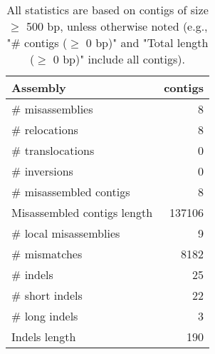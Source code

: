 \documentclass[12pt,a4paper]{article}
\begin{document}
\begin{table}[ht]
\begin{center}
\caption{All statistics are based on contigs of size $\geq$ 500 bp, unless otherwise noted (e.g., "\# contigs ($\geq$ 0 bp)" and "Total length ($\geq$ 0 bp)" include all contigs).}
\begin{tabular}{|l*{1}{|r}|}
\hline
Assembly & contigs \\ \hline
\# misassemblies & 8 \\ \hline
\hspace{5mm}\# relocations & 8 \\ \hline
\hspace{5mm}\# translocations & 0 \\ \hline
\hspace{5mm}\# inversions & 0 \\ \hline
\# misassembled contigs & 8 \\ \hline
Misassembled contigs length & 137106 \\ \hline
\# local misassemblies & 9 \\ \hline
\# mismatches & 8182 \\ \hline
\# indels & 25 \\ \hline
\hspace{5mm}\# short indels & 22 \\ \hline
\hspace{5mm}\# long indels & 3 \\ \hline
Indels length & 190 \\ \hline
\end{tabular}
\end{center}
\end{table}
\end{document}
